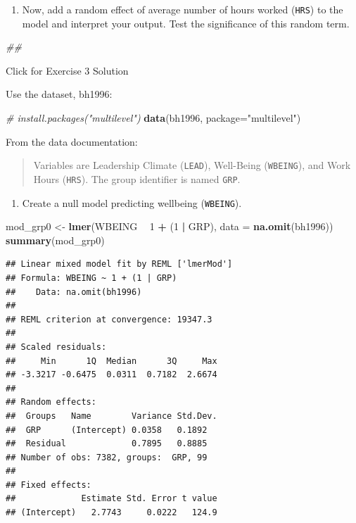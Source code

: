 \documentclass[]{book}
\newenvironment{Shaded}{\begin{snugshade}}{\end{snugshade}}
\newcommand{\CommentTok}[1]{\textcolor[rgb]{0.56,0.35,0.01}{\textit{#1}}}
\newcommand{\DataTypeTok}[1]{\textcolor[rgb]{0.13,0.29,0.53}{#1}}
\newcommand{\DecValTok}[1]{\textcolor[rgb]{0.00,0.00,0.81}{#1}}
\newcommand{\KeywordTok}[1]{\textcolor[rgb]{0.13,0.29,0.53}{\textbf{#1}}}
\newcommand{\NormalTok}[1]{#1}
\newcommand{\OperatorTok}[1]{\textcolor[rgb]{0.81,0.36,0.00}{\textbf{#1}}}
\newcommand{\StringTok}[1]{\textcolor[rgb]{0.31,0.60,0.02}{#1}}
\providecommand{\tightlist}{%
  \setlength{\itemsep}{0pt}\setlength{\parskip}{0pt}}
\begin{document}
\begin{enumerate}
\def\labelenumi{\arabic{enumi}.}
\setcounter{enumi}{3}
\tightlist
\item
  Now, add a random effect of average number of hours worked (\texttt{HRS}) to the model and interpret your output. Test the significance of this random term.
\end{enumerate}

\begin{Shaded}
\begin{Highlighting}[]
\CommentTok{## }
\end{Highlighting}
\end{Shaded}

{Click for Exercise 3 Solution}

Use the dataset, bh1996:

\begin{Shaded}
\begin{Highlighting}[]
  \CommentTok{# install.packages("multilevel")}
  \KeywordTok{data}\NormalTok{(bh1996, }\DataTypeTok{package=}\StringTok{"multilevel"}\NormalTok{)}
\end{Highlighting}
\end{Shaded}

From the data documentation:

\begin{quote}
Variables are Leadership Climate (\texttt{LEAD}), Well-Being (\texttt{WBEING}), and Work Hours (\texttt{HRS}). The group identifier is named \texttt{GRP}.
\end{quote}

\begin{enumerate}
\def\labelenumi{\arabic{enumi}.}
\tightlist
\item
  Create a null model predicting wellbeing (\texttt{WBEING}).
\end{enumerate}

\begin{Shaded}
\begin{Highlighting}[]
\NormalTok{  mod_grp0 <-}\StringTok{ }\KeywordTok{lmer}\NormalTok{(WBEING }\OperatorTok{~}\StringTok{ }\DecValTok{1} \OperatorTok{+}\StringTok{ }\NormalTok{(}\DecValTok{1} \OperatorTok{|}\StringTok{ }\NormalTok{GRP), }\DataTypeTok{data =} \KeywordTok{na.omit}\NormalTok{(bh1996))}
  \KeywordTok{summary}\NormalTok{(mod_grp0)}
\end{Highlighting}
\end{Shaded}

\begin{verbatim}
## Linear mixed model fit by REML ['lmerMod']
## Formula: WBEING ~ 1 + (1 | GRP)
##    Data: na.omit(bh1996)
## 
## REML criterion at convergence: 19347.3
## 
## Scaled residuals: 
##     Min      1Q  Median      3Q     Max 
## -3.3217 -0.6475  0.0311  0.7182  2.6674 
## 
## Random effects:
##  Groups   Name        Variance Std.Dev.
##  GRP      (Intercept) 0.0358   0.1892  
##  Residual             0.7895   0.8885  
## Number of obs: 7382, groups:  GRP, 99
## 
## Fixed effects:
##             Estimate Std. Error t value
## (Intercept)   2.7743     0.0222   124.9
\end{verbatim}
\end{document}
